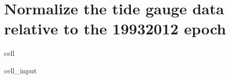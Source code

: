 \documentclass[letterpaper,10pt,english]{jupyterBook}
\begin{document}
\chapter{Normalize the tide gauge data relative to the 1993\sphinxhyphen{}2012 epoch}
\label{\detokenize{notebooks/SL_Data_Wrangling:normalize-the-tide-gauge-data-relative-to-the-1993-2012-epoch}}
\begin{sphinxuseclass}{cell}\begin{sphinxVerbatimInput}

\begin{sphinxuseclass}{cell_input}
\begin{sphinxVerbatim}[commandchars=\\\{\}]
    
   
  
\end{sphinxVerbatim}

\end{sphinxuseclass}\end{sphinxVerbatimInput}

\end{sphinxuseclass}
\end{document}
